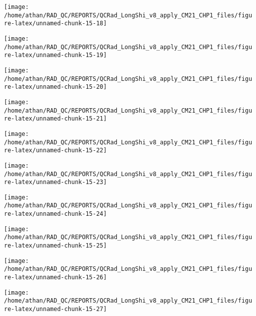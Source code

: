 \documentclass[
  10pt,
  a4paper,oneside]{article}
\begin{document}
\begin{center}\texttt{[image: /home/athan/RAD\_QC/REPORTS/QCRad\_LongShi\_v8\_apply\_CM21\_CHP1\_files/figure-latex/unnamed-chunk-15-18]} \end{center}

\begin{center}\texttt{[image: /home/athan/RAD\_QC/REPORTS/QCRad\_LongShi\_v8\_apply\_CM21\_CHP1\_files/figure-latex/unnamed-chunk-15-19]} \end{center}

\begin{center}\texttt{[image: /home/athan/RAD\_QC/REPORTS/QCRad\_LongShi\_v8\_apply\_CM21\_CHP1\_files/figure-latex/unnamed-chunk-15-20]} \end{center}

\begin{center}\texttt{[image: /home/athan/RAD\_QC/REPORTS/QCRad\_LongShi\_v8\_apply\_CM21\_CHP1\_files/figure-latex/unnamed-chunk-15-21]} \end{center}

\begin{center}\texttt{[image: /home/athan/RAD\_QC/REPORTS/QCRad\_LongShi\_v8\_apply\_CM21\_CHP1\_files/figure-latex/unnamed-chunk-15-22]} \end{center}

\begin{center}\texttt{[image: /home/athan/RAD\_QC/REPORTS/QCRad\_LongShi\_v8\_apply\_CM21\_CHP1\_files/figure-latex/unnamed-chunk-15-23]} \end{center}

\begin{center}\texttt{[image: /home/athan/RAD\_QC/REPORTS/QCRad\_LongShi\_v8\_apply\_CM21\_CHP1\_files/figure-latex/unnamed-chunk-15-24]} \end{center}

\begin{center}\texttt{[image: /home/athan/RAD\_QC/REPORTS/QCRad\_LongShi\_v8\_apply\_CM21\_CHP1\_files/figure-latex/unnamed-chunk-15-25]} \end{center}

\begin{center}\texttt{[image: /home/athan/RAD\_QC/REPORTS/QCRad\_LongShi\_v8\_apply\_CM21\_CHP1\_files/figure-latex/unnamed-chunk-15-26]} \end{center}

\begin{center}\texttt{[image: /home/athan/RAD\_QC/REPORTS/QCRad\_LongShi\_v8\_apply\_CM21\_CHP1\_files/figure-latex/unnamed-chunk-15-27]} \end{center}
\end{document}
